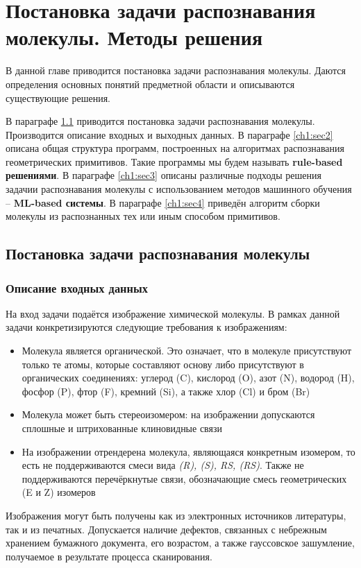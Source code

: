 \chapter{Постановка задачи распознавания молекулы. Методы решения} \label{ch1}

В данной главе приводится постановка задачи распознавания молекулы. Даются определения основных понятий предметной области и описываются существующие решения.

В параграфе \ref{ch1:sec1} приводится постановка задачи распознавания молекулы. Производится описание входных и выходных данных. В параграфе \ref{ch1:sec2} описана общая структура программ, построенных на  алгоритмах распознавания геометрических примитивов. Такие программы мы будем называть \textbf{rule-based решениями}. В параграфе \ref{ch1:sec3} описаны различные подходы решения задачии распознавания молекулы с использованием методов машинного обучения -- \textbf{ML-based системы}. В параграфе \ref{ch1:sec4} приведён алгоритм сборки молекулы из распознанных тех или иным способом примитивов.

\section{Постановка задачи распознавания молекулы} \label{ch1:sec1}
\subsection{Описание входных данных}
На вход задачи подаётся изображение химической молекулы. В рамках данной задачи конкретизируются следующие требования к изображениям:
\begin{itemize}
	\item Молекула является органической. Это означает, что в молекуле присутствуют только те атомы, которые составляют основу либо присутствуют в органических соединениях: углерод (C), кислород (O), азот (N), водород (H), фосфор (P), фтор (F), кремний (Si), а также хлор (Cl) и бром (Br)
	\item Молекула может быть стереоизомером: на изображении допускаются сплошные и штрихованные клиновидные связи
	\item На изображении отрендерена молекула, являющаяся конкретным изомером, то есть не поддерживаются смеси вида \textit{(R), (S), RS, (RS)}. Также не поддерживаются перечёркнутые связи, обозначающие смесь геометрических (E и Z) изомеров
\end{itemize}

Изображения могут быть получены как из электронных источников литературы, так и из печатных. Допускается наличие дефектов, связанных с небрежным хранением бумажного документа, его возрастом, а также гауссовское зашумление, получаемое в результате процесса сканирования.

